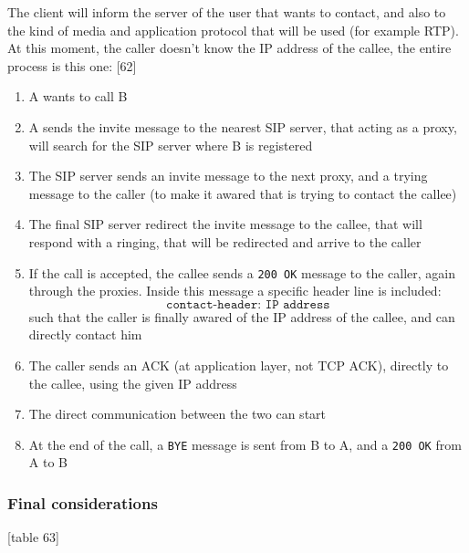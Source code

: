\noindent The client will inform the server of the user that wants to contact, and also to the kind of media and application protocol that will be used (for example RTP). At this moment, the caller doesn't know the IP address of the callee, the entire process is this one:
[62]
\begin{enumerate}
    \item A wants to call B
    \item A sends the invite message to the nearest SIP server, that acting as a proxy, will search for the SIP server where B is registered
    \item The SIP server sends an invite message to the next proxy, and a trying message to the caller (to make it awared that is trying to contact the callee)
    \item The final SIP server redirect the invite message to the callee, that will respond with a ringing, that will be redirected and arrive to the caller
    \item If the call is accepted, the callee sends a \texttt{200 OK} message to the caller, again through the proxies. Inside this message a specific header line is included:
    \[\texttt{contact-header: IP address}\]
    such that the caller is finally awared of the IP address of the callee, and can directly contact him
    \item The caller sends an ACK (at application layer, not TCP ACK), directly to the callee, using the given IP address
    \item The direct communication between the two can start
    \item At the end of the call, a \texttt{BYE} message is sent from B to A, and a \texttt{200 OK} from A to B
\end{enumerate}

\subsubsection{Final considerations}
[table 63]